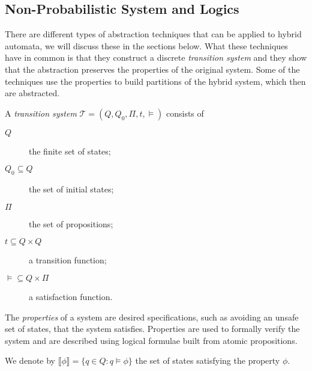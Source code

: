 \subsection{Non-Probabilistic System and Logics}
There are different types of abstraction techniques that can be applied to hybrid automata, we will discuss these in the sections below. What these techniques have in common is that they construct a discrete \emph{transition system} and they show that the abstraction preserves the properties of the original system. Some of the techniques use the properties to build partitions of the hybrid system, which then are abstracted.
\begin{defi}
A \emph{transition system} $\mathcal{T}=(Q,Q_{0},\Pi,t,\models)$ consists of
\begin{description}
    \item[$Q$]{the finite set of states;}
    \item[$Q_{0}\subseteq Q$]{the set of initial states;}
    \item[$\Pi$]{the set of propositions;}
    \item[$t \subseteq Q\times Q$]{a transition function;}
    \item[$\models\subseteq Q\times\Pi$]{a satisfaction function.}
\end{description}
\end{defi}

The \emph{properties} of a system are desired specifications, such as avoiding an unsafe set of states, that the system satisfies. Properties are used to formally verify the system and are described using logical formulae built from atomic propositions.

We denote by $\llbracket \phi \rrbracket = \{ q\in Q : q\models \phi\}$ the set of states satisfying the property $\phi$.


